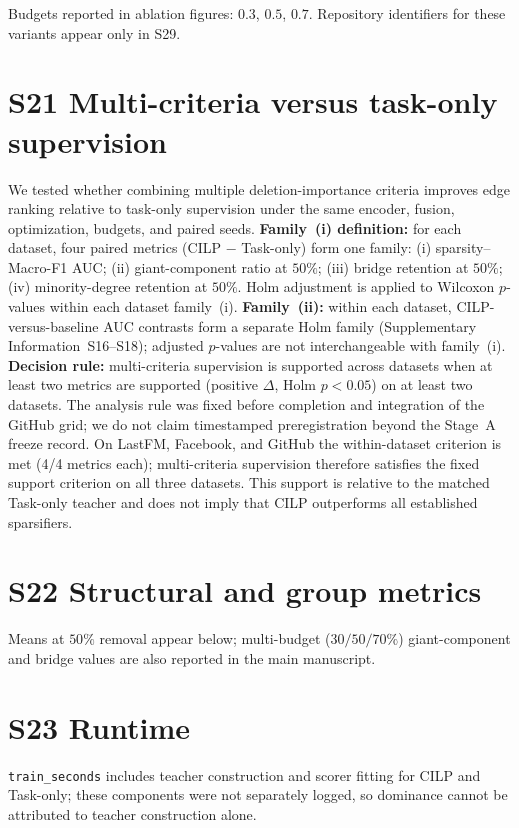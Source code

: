 \documentclass[11pt,a4paper]{article}
\begin{document}
Budgets reported in ablation figures: $0.3$, $0.5$, $0.7$.
Repository identifiers for these variants appear only in S29.

\section{S21 Multi-criteria versus task-only supervision}
We tested whether combining multiple deletion-importance criteria improves edge ranking relative to task-only supervision under the same encoder, fusion, optimization, budgets, and paired seeds.
\textbf{Family~(i) definition:} for each dataset, four paired metrics (CILP $-$ Task-only) form one family:
(i) sparsity--Macro-F1 AUC;
(ii) giant-component ratio at $50\%$;
(iii) bridge retention at $50\%$;
(iv) minority-degree retention at $50\%$.
Holm adjustment is applied to Wilcoxon $p$-values within each dataset family~(i).
\textbf{Family~(ii):} within each dataset, CILP-versus-baseline AUC contrasts form a separate Holm family (Supplementary Information~S16--S18); adjusted $p$-values are not interchangeable with family~(i).
\textbf{Decision rule:} multi-criteria supervision is supported across datasets when at least two metrics are supported (positive $\Delta$, Holm $p{<}0.05$) on at least two datasets.
The analysis rule was fixed before completion and integration of the GitHub grid; we do not claim timestamped preregistration beyond the Stage~A freeze record.
On LastFM, Facebook, and GitHub the within-dataset criterion is met (4/4 metrics each); multi-criteria supervision therefore satisfies the fixed support criterion on all three datasets.
This support is relative to the matched Task-only teacher and does not imply that CILP outperforms all established sparsifiers.


\section{S22 Structural and group metrics}
Means at $50\%$ removal appear below; multi-budget ($30/50/70\%$) giant-component and bridge values are also reported in the main manuscript.
\begin{center}\scriptsize

\end{center}

\section{S23 Runtime}
\texttt{train\_seconds} includes teacher construction and scorer fitting for CILP and Task-only; these components were not separately logged, so dominance cannot be attributed to teacher construction alone.
\begin{center}\scriptsize

\end{center}
\end{document}
